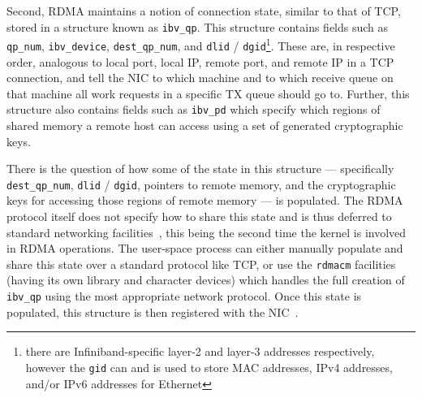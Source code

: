\documentclass[12pt,titlepage]{article}
\begin{document}
Second, RDMA maintains a notion of connection state, similar to that of TCP, stored in a structure known as \texttt{ibv\_qp}\@.
This structure contains fields such as \texttt{qp\_num}, \texttt{ibv\_device}, \texttt{dest\_qp\_num}, and \texttt{dlid} / \texttt{dgid}\footnote{there are Infiniband-specific layer-2 and layer-3 addresses respectively, however the \texttt{gid} can and is used to store MAC addresses, IPv4 addresses, and/or IPv6 addresses for Ethernet}.
These are, in respective order, analogous to local port, local IP, remote port, and remote IP in a TCP connection, and tell the NIC to which machine and to which receive queue on that machine all work requests in a specific TX queue should go to.
Further, this structure also contains fields such as \texttt{ibv\_pd} which specify which regions of shared memory a remote host can access using a set of generated cryptographic keys.

There is the question of how some of the state in this structure --- specifically \texttt{dest\_qp\_num}, \texttt{dlid} / \texttt{dgid}, pointers to remote memory, and the cryptographic keys for accessing those regions of remote memory --- is populated.
The RDMA protocol itself does not specify how to share this state and is thus deferred to standard networking facilities~\cite{rocev2spec}, this being the second time the kernel is involved in RDMA operations.
The user-space process can either manually populate and share this state over a standard protocol like TCP, or use the \texttt{rdmacm} facilities (having its own library and character devices) which handles the full creation of \texttt{ibv\_qp} using the most appropriate network protocol.
Once this state is populated, this structure is then registered with the NIC~\cite{rdmacoredocumentation,rdmacorerepo,rdmaawareprogramming}.
\end{document}
